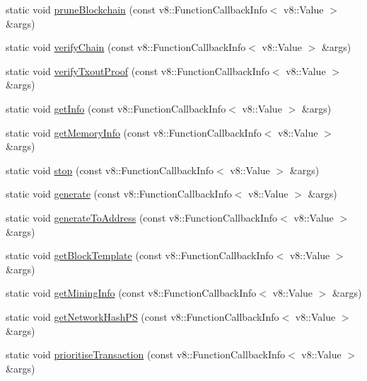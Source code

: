 \begin{DoxyCompactItemize}
static void \mbox{\hyperlink{class_rad_j_a_v_1_1_blockchain_v1_a6a5b38290703f77572adef271545803c}{prune\+Blockchain}} (const v8\+::\+Function\+Callback\+Info$<$ v8\+::\+Value $>$ \&args)
\item 
static void \mbox{\hyperlink{class_rad_j_a_v_1_1_blockchain_v1_a3549bbdc5d7cca1c0420919db3bbabc8}{verify\+Chain}} (const v8\+::\+Function\+Callback\+Info$<$ v8\+::\+Value $>$ \&args)
\item 
static void \mbox{\hyperlink{class_rad_j_a_v_1_1_blockchain_v1_aefef8d116e64a225d67161d70cf28a29}{verify\+Txout\+Proof}} (const v8\+::\+Function\+Callback\+Info$<$ v8\+::\+Value $>$ \&args)
\item 
static void \mbox{\hyperlink{class_rad_j_a_v_1_1_blockchain_v1_a6d21df565ee3db8fae0ced544fb2c4e2}{get\+Info}} (const v8\+::\+Function\+Callback\+Info$<$ v8\+::\+Value $>$ \&args)
\item 
static void \mbox{\hyperlink{class_rad_j_a_v_1_1_blockchain_v1_a94e987fd9bbf8149dfbdfea3e9b7e142}{get\+Memory\+Info}} (const v8\+::\+Function\+Callback\+Info$<$ v8\+::\+Value $>$ \&args)
\item 
static void \mbox{\hyperlink{class_rad_j_a_v_1_1_blockchain_v1_af07edbc0ceb8cab0839177d741109e32}{stop}} (const v8\+::\+Function\+Callback\+Info$<$ v8\+::\+Value $>$ \&args)
\item 
static void \mbox{\hyperlink{class_rad_j_a_v_1_1_blockchain_v1_a968c68414daf0be90071f267408d507f}{generate}} (const v8\+::\+Function\+Callback\+Info$<$ v8\+::\+Value $>$ \&args)
\item 
static void \mbox{\hyperlink{class_rad_j_a_v_1_1_blockchain_v1_ad15fc8c6baa7467022e980bff0c48532}{generate\+To\+Address}} (const v8\+::\+Function\+Callback\+Info$<$ v8\+::\+Value $>$ \&args)
\item 
static void \mbox{\hyperlink{class_rad_j_a_v_1_1_blockchain_v1_a41b5cb16400d55360891dffdf0b078b6}{get\+Block\+Template}} (const v8\+::\+Function\+Callback\+Info$<$ v8\+::\+Value $>$ \&args)
\item 
static void \mbox{\hyperlink{class_rad_j_a_v_1_1_blockchain_v1_a2325ad8a2a7a03545fb63a2c8a954367}{get\+Mining\+Info}} (const v8\+::\+Function\+Callback\+Info$<$ v8\+::\+Value $>$ \&args)
\item 
static void \mbox{\hyperlink{class_rad_j_a_v_1_1_blockchain_v1_a86c27b4e45d10dbea23c860a08c8c337}{get\+Network\+Hash\+PS}} (const v8\+::\+Function\+Callback\+Info$<$ v8\+::\+Value $>$ \&args)
\item 
static void \mbox{\hyperlink{class_rad_j_a_v_1_1_blockchain_v1_adfded1baeffdd3905d44fd515f26f1fb}{prioritise\+Transaction}} (const v8\+::\+Function\+Callback\+Info$<$ v8\+::\+Value $>$ \&args)

\end{DoxyCompactItemize}
